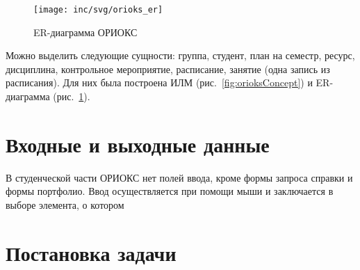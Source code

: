 \begin{figure}[ht]
  \centering
  \texttt{[image: inc/svg/orioks\_er]}
  \caption{ER-диаграмма ОРИОКС}
  \label{fig:orioksEr}
\end{figure}

Можно выделить следующие сущности: группа, студент, план на семестр, ресурс, дисциплина, контрольное мероприятие, расписание, занятие (одна запись из расписания).
Для них была построена ИЛМ (рис.~\ref{fig:orioksConcept}) и ER-диаграмма (рис.~\ref{fig:orioksEr}).


\section{Входные и выходные данные}
\label{sec:io}
В студенческой части ОРИОКС нет полей ввода, кроме формы запроса справки и формы портфолио.
Ввод осуществляется при помощи мыши и заключается в выборе элемента, о котором


\section{Постановка задачи}
\label{sec:problem}

\conclusions
\label{sec:researchConclusions}

